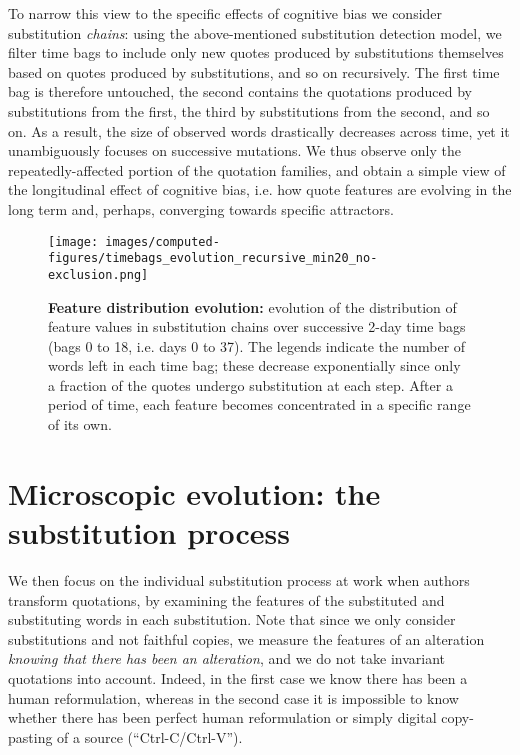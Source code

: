 \bigskip
To narrow this view to the specific effects of cognitive bias we consider substitution \emph{chains}: using the above-mentioned substitution detection model, we filter time bags to include only new quotes produced by substitutions themselves based on quotes produced by substitutions, and so on recursively.
The first time bag is therefore untouched, the second contains the quotations produced by substitutions from the first, the third by substitutions from the second, and so on.
As a result, the size of observed words drastically decreases across time, yet it unambiguously focuses on successive mutations.
We thus observe only the repeatedly-affected portion of the quotation families, and obtain a simple view of the longitudinal effect of cognitive bias, \hbox{i.e.} how quote features are evolving in the long term and, perhaps, converging towards specific attractors.


\begin{figure*}[!tbh]
    \centering
    \texttt{[image: images/computed-figures/timebags\_evolution\_recursive\_min20\_no-exclusion.png]}
    \caption{\textbf{Feature distribution evolution:} evolution of the distribution of feature values in substitution chains over successive 2-day time bags (bags 0 to 18, i.e. days 0 to 37).
    The legends indicate the number of words left in each time bag; these decrease exponentially since only a fraction of the quotes undergo substitution at each step.
    After a period of time, each feature becomes concentrated in a specific range of its own.}
    \label{fig:timebags-evolution}
\end{figure*}

\section{Microscopic evolution: the substitution process}

We then focus on the individual substitution process at work when authors transform quotations, by examining the features of the substituted and substituting words in each substitution.
Note that since we only consider substitutions and not faithful copies, we measure the features of an alteration \emph{knowing that there has been an alteration}, and we do not take invariant quotations into account.
Indeed, in the first case we know there has been a human reformulation, whereas in the second case it is impossible to know whether there has been perfect human reformulation or simply digital copy-pasting of a source (``{\sc Ctrl-C}/{\sc Ctrl-V}'').

